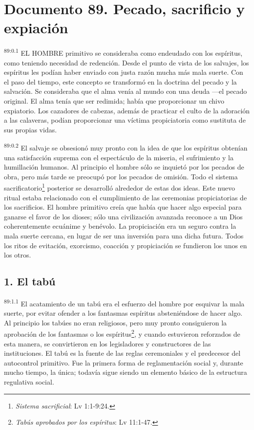 \chapter{Documento 89. Pecado, sacrificio y expiación}
\par
\textsuperscript{89:0.1} EL HOMBRE primitivo se consideraba como endeudado con los espíritus, como teniendo necesidad de redención. Desde el punto de vista de los salvajes, los espíritus les podían haber enviado con justa razón mucha más mala suerte. Con el paso del tiempo, este concepto se transformó en la doctrina del pecado y la salvación. Se consideraba que el alma venía al mundo con una deuda ---el pecado original. El alma tenía que ser redimida; había que proporcionar un chivo expiatorio. Los cazadores de cabezas, además de practicar el culto de la adoración a las calaveras, podían proporcionar una víctima propiciatoria como sustituta de sus propias vidas.

\par
\textsuperscript{89:0.2} El salvaje se obsesionó muy pronto con la idea de que los espíritus obtenían una satisfacción suprema con el espectáculo de la miseria, el sufrimiento y la humillación humanos. Al principio el hombre sólo se inquietó por los pecados de obra, pero más tarde se preocupó por los pecados de omisión. Todo el sistema sacrificatorio\footnote{\textit{Sistema sacrificial}: Lv 1:1-9:24.} posterior se desarrolló alrededor de estas dos ideas. Este nuevo ritual estaba relacionado con el cumplimiento de las ceremonias propiciatorias de los sacrificios. El hombre primitivo creía que había que hacer algo especial para ganarse el favor de los dioses; sólo una civilización avanzada reconoce a un Dios coherentemente ecuánime y benévolo. La propiciación era un seguro contra la mala suerte cercana, en lugar de ser una inversión para una dicha futura. Todos los ritos de evitación, exorcismo, coacción y propiciación se fundieron los unos en los otros.

\section*{1. El tabú}
\par
\textsuperscript{89:1.1} El acatamiento de un tabú era el esfuerzo del hombre por esquivar la mala suerte, por evitar ofender a los fantasmas espíritus absteniéndose de hacer algo. Al principio los tabúes no eran religiosos, pero muy pronto consiguieron la aprobación de los fantasmas o los espíritus\footnote{\textit{Tabús aprobados por los espíritus}: Lv 11:1-47.}, y cuando estuvieron reforzados de esta manera, se convirtieron en los legisladores y constructores de las instituciones. El tabú es la fuente de las reglas ceremoniales y el predecesor del autocontrol primitivo. Fue la primera forma de reglamentación social y, durante mucho tiempo, la única; todavía sigue siendo un elemento básico de la estructura regulativa social.

